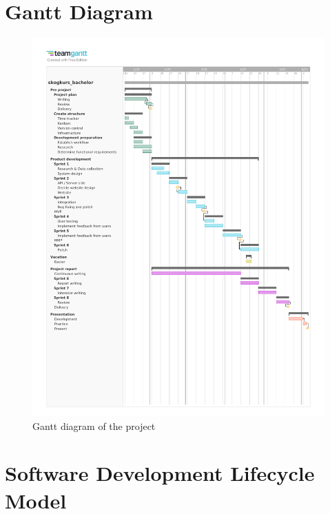 \section{Gantt Diagram}
\begin{figure}[h]
    \centering
        \includegraphics[width=1.0\linewidth, trim=0 60mm 0 20mm, clip]{figures/skogkurs_bachelor_gantt.pdf}
    \caption{Gantt diagram of the project}
    \label{fig:gantt_diagram}
\end{figure}

\section{Software Development Lifecycle Model}

